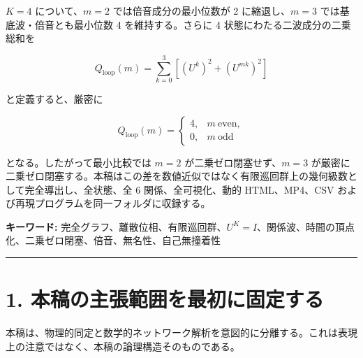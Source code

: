 \documentclass[
  a4paper,
]{ltjsarticle}
\begin{document}
\(K=4\) について、\(m=2\) では倍音成分の最小位数が 2 に縮退し、\(m=3\)
では基底波・倍音とも最小位数 4 を維持する。さらに 4
状態にわたる二波成分の二乗総和を

\[
Q_{\mathrm{loop}}(m)
=
\sum_{k=0}^{3}\left[(U^k)^2+(U^{mk})^2\right]
\]

と定義すると、厳密に

\[
Q_{\mathrm{loop}}(m)
=
\begin{cases}
4,&m\ \mathrm{even},\\
0,&m\ \mathrm{odd}
\end{cases}
\]

となる。したがって最小比較では \(m=2\) が二乗ゼロ閉塞せず、\(m=3\)
が厳密に二乗ゼロ閉塞する。本稿はこの差を数値近似ではなく有限巡回群上の幾何級数として完全導出し、全状態、全
6 関係、全可視化、動的 HTML、MP4、CSV
および再現プログラムを同一フォルダに収録する。

\textbf{キーワード:}
完全グラフ、離散位相、有限巡回群、\(U^K=I\)、関係波、時間の頂点化、二乗ゼロ閉塞、倍音、無名性、自己無撞着性

\begin{center}\rule{0.5\linewidth}{0.5pt}\end{center}

\section{1.
本稿の主張範囲を最初に固定する}\label{ux672cux7a3fux306eux4e3bux5f35ux7bc4ux56f2ux3092ux6700ux521dux306bux56faux5b9aux3059ux308b}

本稿は、物理的同定と数学的ネットワーク解析を意図的に分離する。これは表現上の注意ではなく、本稿の論理構造そのものである。
\end{document}
